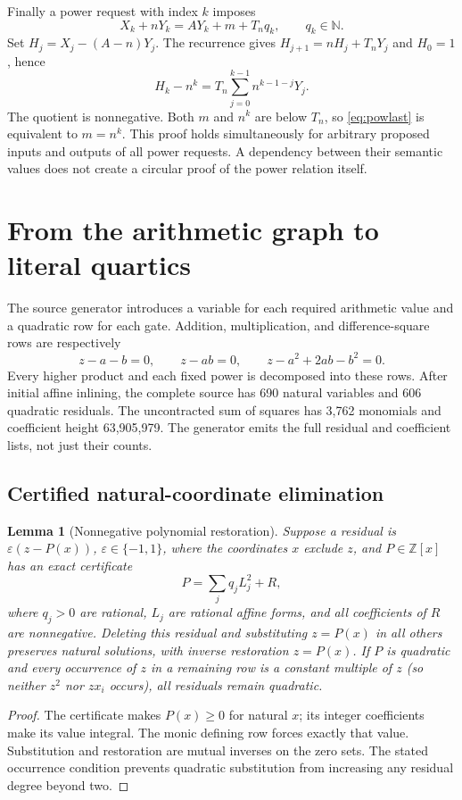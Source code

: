 \documentclass[10pt,letterpaper]{article}
\newtheorem{lemma}[theorem]{Lemma}
\theoremstyle{definition}\newtheorem{definition}[theorem]{Definition}
\theoremstyle{remark}\newtheorem{remark}[theorem]{Remark}
\newcommand{\N}{\mathbb N}\newcommand{\Z}{\mathbb Z}\newcommand{\Q}{\mathbb Q}
\begin{document}
Finally a power request with index $k$ imposes
\begin{equation}\label{eq:powlast}
 X_k+nY_k=AY_k+m+T_nq_k,\qquad q_k\in\N.
\end{equation}
Set $H_j=X_j-(A-n)Y_j$. The recurrence gives
$H_{j+1}=nH_j+T_nY_j$ and $H_0=1$, hence
\[
 H_k-n^k=T_n\sum_{j=0}^{k-1}n^{k-1-j}Y_j.
\]
The quotient is nonnegative. Both $m$ and $n^k$ are below $T_n$, so
\eqref{eq:powlast} is equivalent to $m=n^k$.
This proof holds simultaneously for arbitrary proposed inputs and outputs
of all power requests. A dependency between their semantic values does
not create a circular proof of the power relation itself.

\section{From the arithmetic graph to literal quartics}
\label{sec:compile}

The source generator introduces a variable for each required arithmetic
value and a quadratic row for each gate. Addition, multiplication, and
difference-square rows are respectively
\[
 z-a-b=0,\qquad z-ab=0,\qquad z-a^2+2ab-b^2=0.
\]
Every higher product and each fixed power is decomposed into these rows.
After initial affine inlining, the complete source has 690 natural
variables and 606 quadratic residuals. The uncontracted sum of squares
has 3,762 monomials and coefficient height 63,905,979.
The generator emits the full residual and coefficient lists, not just
their counts.

\subsection{Certified natural-coordinate elimination}

\begin{lemma}[Nonnegative polynomial restoration]\label{lem:restore}
Suppose a residual is $\varepsilon(z-P(x))$, $\varepsilon\in\{-1,1\}$,
where the coordinates $x$ exclude $z$, and $P\in\Z[x]$ has an exact certificate
\[
 P=\sum_j q_jL_j^2+R,
\]
where $q_j>0$ are rational, $L_j$ are rational affine forms, and all
coefficients of $R$ are nonnegative. Deleting this residual and
substituting $z=P(x)$ in all others preserves natural solutions, with
inverse restoration $z=P(x)$. If $P$ is quadratic and every occurrence
of $z$ in a remaining row is a constant multiple of $z$ (so neither
$z^2$ nor $zx_i$ occurs), all residuals remain quadratic.
\end{lemma}
\begin{proof}
The certificate makes $P(x)\ge0$ for natural $x$; its integer
coefficients make its value integral. The monic defining row forces
exactly that value. Substitution and restoration are mutual inverses on
the zero sets. The stated occurrence condition prevents quadratic
substitution from increasing any residual degree beyond two.
\end{proof}
\end{document}
